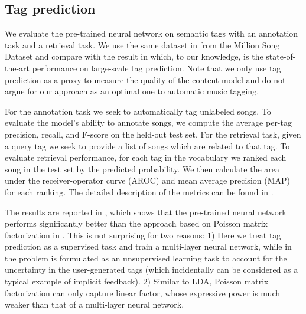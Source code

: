 \subsection{Tag prediction}\label{chpt:content:sec:exp_tag}

We evaluate the pre-trained neural network on semantic tags with an annotation task and a retrieval task. We use the same dataset in  from the Million Song Dataset \citep{bertin2011million} and compare with the result in  which, to our knowledge, is the state-of-the-art performance on large-scale tag prediction. Note that we only use tag prediction as a proxy to measure the quality of the content model and do not argue for our approach as an optimal one to automatic music tagging.  

For the annotation task we seek to automatically tag unlabeled songs. To evaluate the model's ability to annotate songs, we compute the average per-tag precision, recall, and F-score on the held-out test set. %
For the retrieval task, given a query tag we seek to provide a list of songs which are related to that tag. To evaluate retrieval performance, for each tag in the vocabulary we ranked each song in the test set by the predicted probability. We then calculate the area under the receiver-operator curve (AROC) and mean average precision (MAP) for each ranking. %
The detailed description of the metrics can be found in .

The results are reported in , which shows that the pre-trained neural network performs significantly better than the approach based on Poisson matrix factorization in . This is not surprising for two reasons: 1) Here we treat tag prediction as a supervised task and train a multi-layer neural network, while in  the problem is formulated as an unsupervised learning task to account for the uncertainty in the user-generated tags (which incidentally can be considered as a typical example of implicit feedback). 2) Similar to \gls{LDA}, Poisson matrix factorization can only capture linear factor, whose expressive power is much weaker than that of a multi-layer neural network. 


